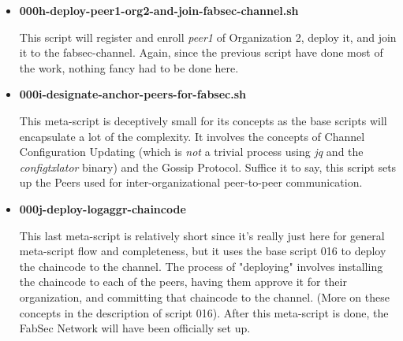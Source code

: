 \begin{itemize}
				\item \textbf{000h-deploy-peer1-org2-and-join-fabsec-channel.sh}
				
					\hspace{10mm}This script will register and enroll \textit{peer1} of Organization 2, deploy it, and join it to the fabsec-channel. Again, since the previous script have done most of the work, nothing fancy had to be done here.
					
				\item \textbf{000i-designate-anchor-peers-for-fabsec.sh}
				
					\hspace{10mm}This meta-script is deceptively small for its concepts as the base scripts will encapsulate a lot of the complexity. It involves the concepts of Channel Configuration Updating (which is \textit{not} a trivial process using \textit{jq} and the \textit{configtxlator} binary) and the Gossip Protocol. Suffice it to say, this script sets up the Peers used for inter-organizational peer-to-peer communication.
					
				\item \textbf{000j-deploy-logaggr-chaincode}
				
					\hspace{10mm}This last meta-script is relatively short since it's really just here for general meta-script flow and completeness, but it uses the base script 016 to deploy the chaincode to the channel. The process of "deploying" involves installing the chaincode to each of the peers, having them approve it for their organization, and committing that chaincode to the channel. (More on these concepts in the description of script 016). After this meta-script is done, the FabSec Network will have been officially set up.		
			\end{itemize}
			
